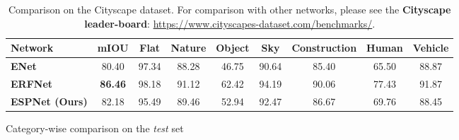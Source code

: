 \documentclass[runningheads]{llncs}
\begin{document}
\begin{table}[t!]
\begin{subtable}[b]{\columnwidth}
{\begin{tabular}{l|c|ccccccc}
\toprule
\textbf{Network} & \textbf{mIOU} & \textbf{Flat} & \textbf{Nature} & \textbf{Object} & \textbf{Sky} & \textbf{Construction} & \textbf{Human} & \textbf{Vehicle} \\
\midrule
\textbf{ENet} \cite{paszke2016enet} & 80.40 & 97.34 & 88.28 & 46.75 & 90.64 & 85.40 & 65.50 & 88.87 \\
\textbf{ERFNet} \cite{romera2018erfnet} & \textbf{86.46} & 98.18 & 91.12 & 62.42 & 94.19 & 90.06 & 77.43 & 91.87 \\
\textbf{ESPNet (Ours)} & 82.18 & 95.49 & 89.46 & 52.94 & 92.47 & 86.67 & 69.76 & 88.45 \\
\bottomrule
\end{tabular}
}
\caption{Category-wise comparison on the \textit{test} set}
\label{tab:compareCatSup}
\end{subtable}
\caption{Comparison on the Cityscape dataset. For comparison with other networks, please see the \textbf{Cityscape leader-board}: \url{https://www.cityscapes-dataset.com/benchmarks/}.}
\label{tab:compareClassCatSup}
\end{table}

\begin{table}[t!]
\centering
{}
\caption{Category-wise comparison on the Mapillary \textit{validation} set. ESPNet learned generalizable representations of objects and outperformed both ENet and ERFNet in the wild.}
\label{tab:compareCatMapSup}
\end{table}
\end{document}
